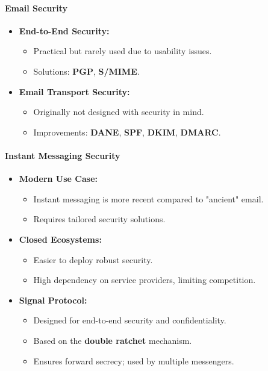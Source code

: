 \paragraph{Email Security}
\begin{itemize}
    \item \textbf{End-to-End Security:} 
    \begin{itemize}
        \item Practical but rarely used due to usability issues.
        \item Solutions: \textbf{PGP}, \textbf{S/MIME}.
    \end{itemize}
    \item \textbf{Email Transport Security:}
    \begin{itemize}
        \item Originally not designed with security in mind.
        \item Improvements: \textbf{DANE}, \textbf{SPF}, \textbf{DKIM}, \textbf{DMARC}.
    \end{itemize}
\end{itemize}

\paragraph{Instant Messaging Security}
\begin{itemize}
    \item \textbf{Modern Use Case:}
    \begin{itemize}
        \item Instant messaging is more recent compared to "ancient" email.
        \item Requires tailored security solutions.
    \end{itemize}
    \item \textbf{Closed Ecosystems:}
    \begin{itemize}
        \item Easier to deploy robust security.
        \item High dependency on service providers, limiting competition.
    \end{itemize}
    \item \textbf{Signal Protocol:}
    \begin{itemize}
        \item Designed for end-to-end security and confidentiality.
        \item Based on the \textbf{double ratchet} mechanism.
        \item Ensures forward secrecy; used by multiple messengers.
    \end{itemize}
\end{itemize}

